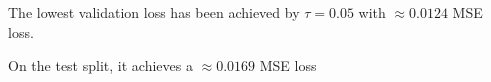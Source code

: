 \begin{answer}
    
    The lowest validation loss has been achieved by $\tau = 0.05$ with $\approx 0.0124$ MSE loss.

    On the test split, it achieves a $\approx 0.0169$ MSE loss
\end{answer}

